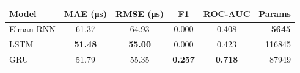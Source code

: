\begin{tabular}{lccccr}
  \toprule
  Model & MAE (\si{\micro\second}) & RMSE (\si{\micro\second}) & F1 & ROC-AUC & Params \\
  \midrule
  Elman RNN   & 61.37 & 64.93 & 0.000 & 0.408 & \textbf{\num{5645}} \\
  LSTM        & \textbf{51.48} & \textbf{55.00} & 0.000 & 0.423 & \num{116845} \\
  GRU         & 51.79 & 55.35 & \textbf{0.257} & \textbf{0.718} & \num{87949} \\
  \bottomrule
\end{tabular}
